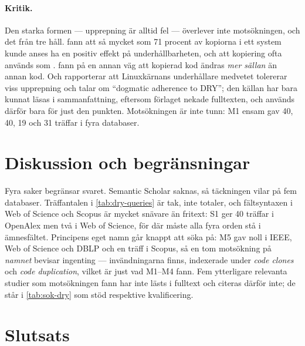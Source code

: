 \paragraph{Kritik.}  Den starka formen --- upprepning är alltid fel ---
överlever inte motsökningen, och det från tre håll.
\textcite{KapserGodfrey2008} fann att så mycket som 71 procent av
kopiorna i ett system kunde anses ha en positiv effekt på
underhållbarheten, och att kopiering ofta används som
.
\textcite{Krinke2008Stability} fann på en annan väg att kopierad kod
ändras \emph{mer sällan} än annan kod.  Och \textcite{Arcanjo2026DRY}
rapporterar att Linuxkärnans underhållare medvetet tolererar viss
upprepning och talar om \enquote{dogmatic adherence to DRY}; den källan
har bara kunnat läsas i sammanfattning, eftersom förlaget nekade
fulltexten, och används därför bara för just den punkten.  Motsökningen
är inte tunn: M1 ensam gav 40, 40, 19 och 31 träffar i fyra databaser.

\section{Diskussion och begränsningar}
\label{sec:dry-diskussion}

Fyra saker begränsar svaret.  Semantic Scholar saknas, så täckningen
vilar på fem databaser.  Träffantalen i
\cref{tab:dry-queries} är tak, inte totaler, och fältsyntaxen i Web of
Science och Scopus är mycket snävare än fritext: S1 ger 40 träffar i
OpenAlex men två i Web of Science, för där måste alla fyra orden stå i
ämnesfältet.  Principens eget namn går knappt att söka på: M5 gav noll i
IEEE, Web of Science och DBLP och en träff i Scopus, så en tom
motsökning på \emph{namnet} bevisar ingenting --- invändningarna finns,
indexerade under \emph{code clones} och \emph{code duplication}, vilket
är just vad M1--M4 fann.  Fem ytterligare relevanta studier som motsökningen fann
har inte lästs i fulltext och citeras därför inte; de står i
\cref{tab:sok-dry} som stöd respektive kvalificering.

\section{Slutsats}
\label{sec:dry-slutsats}

